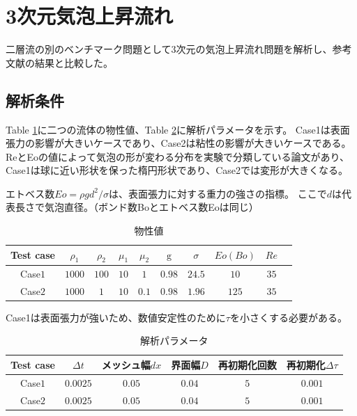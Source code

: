 \newpage
\section{3次元気泡上昇流れ}

二層流の別のベンチマーク問題として3次元の気泡上昇流れ問題を解析し、参考文献の結果と比較した。

\subsection{解析条件}

Table \ref{table:3d-bubble-material-property}に二つの流体の物性値、Table \ref{table:3d-bubble-parameter}に解析パラメータを示す。
Case1は表面張力の影響が大きいケースであり、Case2は粘性の影響が大きいケースである。
ReとEoの値によって気泡の形が変わる分布を実験で分類している論文があり、Case1は球に近い形状を保った楕円形状であり、Case2では変形が大きくなる。

エトベス数$Eo = \rho g d^2 / \sigma$は、表面張力に対する重力の強さの指標。
ここで$d$は代表長さで気泡直径。（ボンド数Boとエトベス数Eoは同じ）



\renewcommand{\arraystretch}{1}
\begin{table}[H]
	\centering
	\caption{物性値}
	\begin{tabular}{cccccccccc}
		\hline
		Test case & $\rho_1$ & $\rho_2$ & $\mu_1$ & $\mu_2$ & $\mathrm{g}$ & $\sigma$ & $Eo (Bo)$ & $Re$ \\
		\hline 
		Case$1$ & $1000$ & $100$ & $10$ & $1$   & $0.98$ & $24.5$ & $10$ & $35$\\
		Case$2$ & $1000$ & $1$   & $10$ & $0.1$ & $0.98$ & $1.96$ & $125$ & $35$\\ 
		\hline         
	\end{tabular}
	\label{table:3d-bubble-material-property}
\end{table}
\renewcommand{\arraystretch}{1.0}

Case1は表面張力が強いため、数値安定性のために$\tau$を小さくする必要がある。\cite{Yamaguchi2018}

\renewcommand{\arraystretch}{1}
\begin{table}[H]
	\centering
	\caption{解析パラメータ}
	\begin{tabular}{cccccc}
		\hline
		Test case & $\Delta t$ & メッシュ幅$dx$ & 界面幅$D$ & 再初期化回数 & 再初期化$\Delta \tau$\\
		\hline 
		Case$1$ & $0.0025$ & $0.05$ & $0.04$ & $5$ & $0.001$\\
		Case$2$ & $0.0025$ & $0.05$ & $0.04$ & $5$ & $0.001$\\
		\hline         
	\end{tabular}
	\label{table:3d-bubble-parameter}
\end{table}
\renewcommand{\arraystretch}{1.0}

